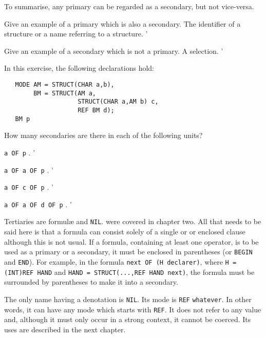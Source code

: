 To summarise, any primary can be regarded as a secondary, but not
vice-versa.

\begin{exercise}
\item Give an example of a primary which is also a secondary.
\ans The identifier of a structure or a name referring to a structure.
'
\item Give an example of a secondary which is not a primary. \ans A
selection.
'
\item In this exercise, the following declarations hold:
\begin{verbatim}
   MODE AM = STRUCT(CHAR a,b),
        BM = STRUCT(AM a,
                    STRUCT(CHAR a,AM b) c,
                    REF BM d);
   BM p
\end{verbatim}
\noindent
How many secondaries are there in each of the following units?
\begin{subex}
\item \verb|a OF p| .
'
\item \verb|a OF a OF p| .
'
\item \verb|a OF c OF p| .
'
\item \verb|a OF a OF d OF p| .
'
\end{subex}
\end{exercise}

Tertiaries are formul\ae{} and \verb|NIL|.  
were covered in chapter two.  All that needs to be said here is that a
formula can consist solely of a single  or 
or enclosed clause although this is not usual.  If a formula,
containing at least one operator, is to be used as a primary or a
secondary, it must be enclosed in parentheses (or \verb|BEGIN| and
\verb|END|).  For example, in the formula
\verb|next OF (H declarer)|, where \verb|H = (INT)REF HAND| and
\verb|HAND = STRUCT(...,REF HAND next)|, the formula must be
surrounded by parentheses to make it into a secondary.

The only name having a denotation is \verb|NIL|. Its mode is
\verb|REF| \verb|whatever|. In other words, it can have any mode
which starts with \verb|REF|. It does not refer to any value and,
although it must only occur in a strong context, it cannot be
coerced. Its uses are described in the next chapter.

